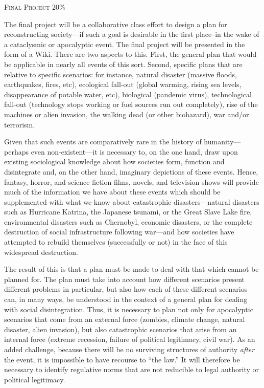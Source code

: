 \documentclass[12pt]{article}
\begin{document}
{\large \textsc{Final Project 20\%}}

The final project will be a collaborative class effort to design a plan for reconstructing society---if such a goal is desirable in the first place--in the wake of a cataclysmic or apocalyptic event. The final project will be presented in the form of a Wiki. There are two aspects to this. First, the general plan that would be applicable in nearly all events of this sort. Second, specific plans that are relative to specific scenarios: for instance, natural disaster (massive floods, earthquakes, fires, etc), ecological fall-out (global warming, rising sea levels, disappearance of potable water, etc), biological (pandemic virus), technological fall-out (technology stops working or fuel sources run out completely), rise of the machines or alien invasion, the walking dead (or other biohazard), war and/or terrorism. 

Given that such events are comparatively rare in the history of humanity---perhaps even non-existent---it is necessary to, on the one hand, draw upon existing sociological knowledge about how societies form, function and disintegrate and, on the other hand, imaginary depictions of these events. Hence, fantasy, horror, and science fiction films, novels, and television shows will provide much of the information we have about these events which should be supplemented with what we know about catastrophic disasters---natural disasters such as Hurricane Katrina, the Japanese tsunami, or the Great Slave Lake fire, environmental disasters such as Chernobyl, economic disasters, or the complete destruction of social infrastructure following war---and how societies have attempted to rebuild themselves (successfully or not) in the face of this widespread destruction.

The result of this is that a plan must be made to deal with that which cannot be planned for. The plan must take into account how different scenarios present different problems in particular, but also how each of these different scenarios can, in many ways, be understood in the context of a general plan for dealing with social disintegration. Thus, it is necessary to plan not only for apocalyptic scenarios that come from an external force (zombies, climate change, natural disaster, alien invasion), but also catastrophic scenarios that arise from an internal force (extreme recession, failure of political legitimacy, civil war). As an added challenge, because there will be no surviving structures of authority \textit{after} the event, it is impossible to have recourse to ``the law.'' It will therefore be necessary to identify regulative norms that are not reducible to legal authority or political legitimacy.
\end{document}

